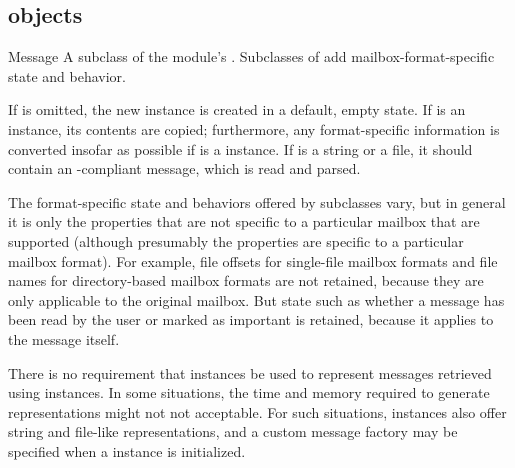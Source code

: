 \begin{seealso}
\end{seealso}

\subsection{ objects}
\label{mailbox-message-objects}

\begin{classdesc}{Message}{}
A subclass of the  module's . Subclasses
of  add mailbox-format-specific state and behavior.

If  is omitted, the new instance is created in a default, empty
state. If  is an  instance, its
contents are copied; furthermore, any format-specific information is converted
insofar as possible if  is a  instance. If
 is a string or a file, it should contain an -compliant
message, which is read and parsed.
\end{classdesc}

The format-specific state and behaviors offered by subclasses vary, but in
general it is only the properties that are not specific to a particular mailbox
that are supported (although presumably the properties are specific to a
particular mailbox format). For example, file offsets for single-file mailbox
formats and file names for directory-based mailbox formats are not retained,
because they are only applicable to the original mailbox. But state such as
whether a message has been read by the user or marked as important is retained,
because it applies to the message itself.

There is no requirement that  instances be used to represent
messages retrieved using  instances. In some situations, the
time and memory required to generate  representations might not
not acceptable. For such situations,  instances also offer
string and file-like representations, and a custom message factory may be
specified when a  instance is initialized. 

